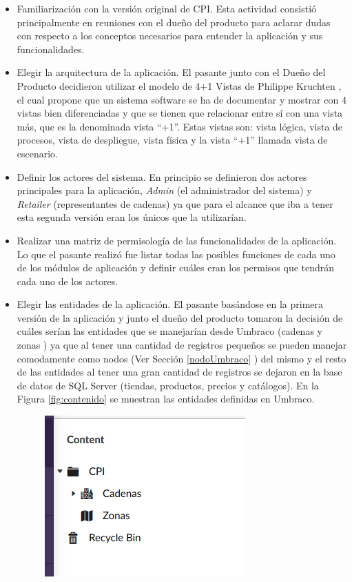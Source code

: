 \begin{itemize}
 \item Familiarización con la versión original de CPI. Esta actividad consistió principalmente en reuniones con el dueño del producto para aclarar dudas con respecto a los conceptos necesarios para entender la aplicación y sus funcionalidades.
 \item Elegir la arquitectura de la aplicación. El pasante junto con el Dueño del Producto decidieron utilizar el modelo de 4+1 Vistas de Philippe Kruchten \cite{vistasKruchten}, el cual  propone que un sistema software se ha de documentar y mostrar con 4 vistas bien diferenciadas y que se 
 tienen que relacionar entre sí con una vista más, que es la denominada vista “+1”. Estas vistas son: vista lógica, vista de procesos, vista de despliegue, vista física y la vista “+1” llamada vista de escenario.
 \item Definir los actores del sistema. En principio se definieron dos actores principales para la aplicación, \textit{Admin} (el administrador del sistema) y \textit{Retailer} (representantes de cadenas) ya que para el alcance que iba a tener esta segunda versión eran los únicos que la utilizarían.
 \item Realizar una matriz de permisología de las funcionalidades de la aplicación. Lo que el pasante realizó fue listar todas las posibles funciones de cada uno de los módulos de aplicación y definir cuáles eran los permisos que tendrán cada uno de los actores.
 \item Elegir las entidades de la aplicación. El pasante basándose en la primera versión de la aplicación y junto el dueño del producto tomaron la decisión de cuáles serían las entidades que se manejarían desde Umbraco (cadenas y zonas ) ya que al tener una cantidad de registros pequeños se pueden manejar comodamente como nodos (Ver Sección \ref{nodoUmbraco} )  del mismo  y el resto de las entidades al tener una gran cantidad de registros se dejaron en la base de datos de SQL Server (tiendas, productos, precios y catálogos). En la Figura \ref{fig:contenido} se muestran las entidades definidas en Umbraco.
 \begin{figure}[H]
  \begin{center}
  \includegraphics[scale=0.6]{content.png}

\end{center}
\end{figure}
\end{itemize}

